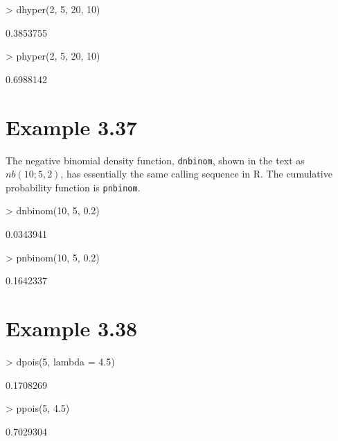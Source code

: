 \documentclass{book}
\begin{document}
\begin{Schunk}
\begin{Sinput}
> dhyper(2, 5, 20, 10)
\end{Sinput}
\begin{Soutput}
[1] 0.3853755
\end{Soutput}
\begin{Sinput}
> phyper(2, 5, 20, 10)
\end{Sinput}
\begin{Soutput}
[1] 0.6988142
\end{Soutput}
\end{Schunk}


\section{Example 3.37}
\label{sec:xmp0337}

The negative binomial density function, \texttt{dnbinom}, shown in the
text as $nb(10; 5, 2)$, has essentially the same calling sequence in
R.  The cumulative probability function is \texttt{pnbinom}.
\begin{Schunk}
\begin{Sinput}
> dnbinom(10, 5, 0.2)
\end{Sinput}
\begin{Soutput}
[1] 0.0343941
\end{Soutput}
\begin{Sinput}
> pnbinom(10, 5, 0.2)
\end{Sinput}
\begin{Soutput}
[1] 0.1642337
\end{Soutput}
\end{Schunk}


\section{Example 3.38}
\label{sec:xmp0338}

\begin{Schunk}
\begin{Sinput}
> dpois(5, lambda = 4.5)
\end{Sinput}
\begin{Soutput}
[1] 0.1708269
\end{Soutput}
\begin{Sinput}
> ppois(5, 4.5)
\end{Sinput}
\begin{Soutput}
[1] 0.7029304
\end{Soutput}
\end{Schunk}
\end{document}
